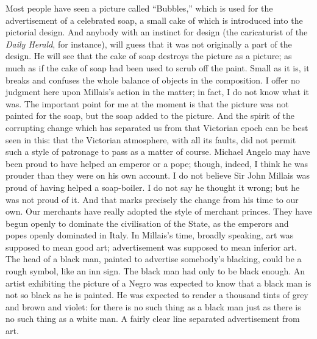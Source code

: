 \documentclass{book}
\begin{document}
Most people have seen a picture called “Bubbles,” which is used for the advertisement of a celebrated soap, a small cake of which is introduced into the pictorial design. And anybody with an instinct for design (the caricaturist of the \emph{Daily Herald}, for instance), will guess that it was not originally a part of the design. He will see that the cake of soap destroys the picture as a picture; as much as if the cake of soap had been used to scrub off the paint. Small as it is, it breaks and confuses the whole balance of objects in the composition. I offer no judgment here upon Millais’s action in the matter; in fact, I do not know what it was. The important point for me at the moment is that the picture was not painted for the soap, but the soap added to the picture. And the spirit of the corrupting change which has separated us from that Victorian epoch can be best seen in this: that the Victorian atmosphere, with all its faults, did not permit such a style of patronage to pass as a matter of course. Michael Angelo may have been proud to have helped an emperor or a pope; though, indeed, I think he was prouder than they were on his own account. I do not believe Sir John Millais was proud of having helped a soap-boiler. I do not say he thought it wrong; but he was not proud of it. And that marks precisely the change from his time to our own. Our merchants have really adopted the style of merchant princes. They have begun openly to dominate the civilisation of the State, as the emperors and popes openly dominated in Italy. In Millais’s time, broadly speaking, art was supposed to mean good art; advertisement was supposed to mean inferior art. The head of a black man, painted to advertise somebody’s blacking, could be a rough symbol, like an inn sign. The black man had only to be black enough. An artist exhibiting the picture of a Negro was expected to know that a black man is not so black as he is painted. He was expected to render a thousand tints of grey and brown and violet: for there is no such thing as a black man just as there is no such thing as a white man. A fairly clear line separated advertisement from art.
\end{document}
